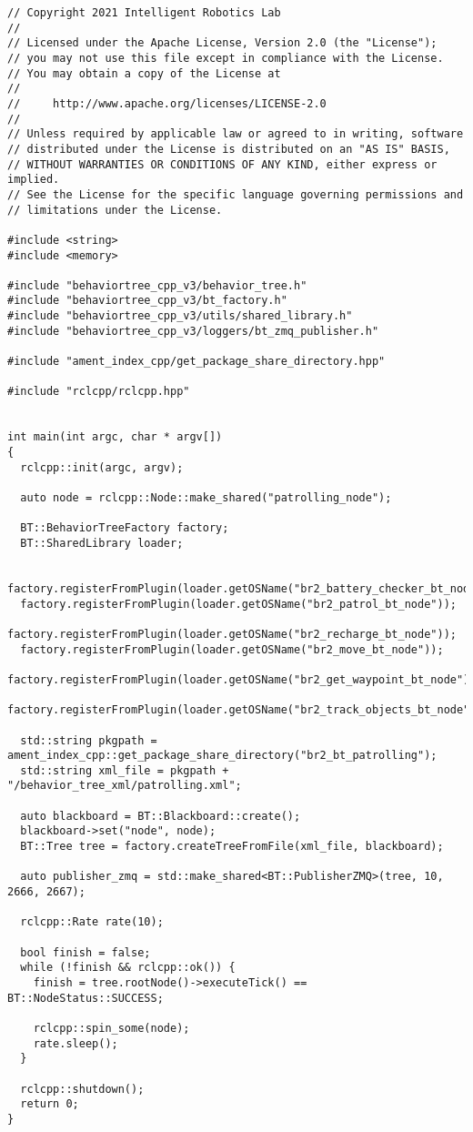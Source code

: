  \footnotesize
\begin{tcolorbox}[sharp corners, colframe=gray!80, colback=LightGray, left=0pt, top=0pt, bottom=0pt, title=\texttt{br2\_bt\_patrolling/src/patrolling\_main.cpp}]
  \begin{verbatim}
// Copyright 2021 Intelligent Robotics Lab
//
// Licensed under the Apache License, Version 2.0 (the "License");
// you may not use this file except in compliance with the License.
// You may obtain a copy of the License at
//
//     http://www.apache.org/licenses/LICENSE-2.0
//
// Unless required by applicable law or agreed to in writing, software
// distributed under the License is distributed on an "AS IS" BASIS,
// WITHOUT WARRANTIES OR CONDITIONS OF ANY KIND, either express or implied.
// See the License for the specific language governing permissions and
// limitations under the License.

#include <string>
#include <memory>

#include "behaviortree_cpp_v3/behavior_tree.h"
#include "behaviortree_cpp_v3/bt_factory.h"
#include "behaviortree_cpp_v3/utils/shared_library.h"
#include "behaviortree_cpp_v3/loggers/bt_zmq_publisher.h"

#include "ament_index_cpp/get_package_share_directory.hpp"

#include "rclcpp/rclcpp.hpp"


int main(int argc, char * argv[])
{
  rclcpp::init(argc, argv);

  auto node = rclcpp::Node::make_shared("patrolling_node");

  BT::BehaviorTreeFactory factory;
  BT::SharedLibrary loader;

  factory.registerFromPlugin(loader.getOSName("br2_battery_checker_bt_node"));
  factory.registerFromPlugin(loader.getOSName("br2_patrol_bt_node"));
  factory.registerFromPlugin(loader.getOSName("br2_recharge_bt_node"));
  factory.registerFromPlugin(loader.getOSName("br2_move_bt_node"));
  factory.registerFromPlugin(loader.getOSName("br2_get_waypoint_bt_node"));
  factory.registerFromPlugin(loader.getOSName("br2_track_objects_bt_node"));

  std::string pkgpath = ament_index_cpp::get_package_share_directory("br2_bt_patrolling");
  std::string xml_file = pkgpath + "/behavior_tree_xml/patrolling.xml";

  auto blackboard = BT::Blackboard::create();
  blackboard->set("node", node);
  BT::Tree tree = factory.createTreeFromFile(xml_file, blackboard);

  auto publisher_zmq = std::make_shared<BT::PublisherZMQ>(tree, 10, 2666, 2667);

  rclcpp::Rate rate(10);

  bool finish = false;
  while (!finish && rclcpp::ok()) {
    finish = tree.rootNode()->executeTick() == BT::NodeStatus::SUCCESS;

    rclcpp::spin_some(node);
    rate.sleep();
  }

  rclcpp::shutdown();
  return 0;
}
    \end{verbatim}
    \end{tcolorbox}
  \normalsize

